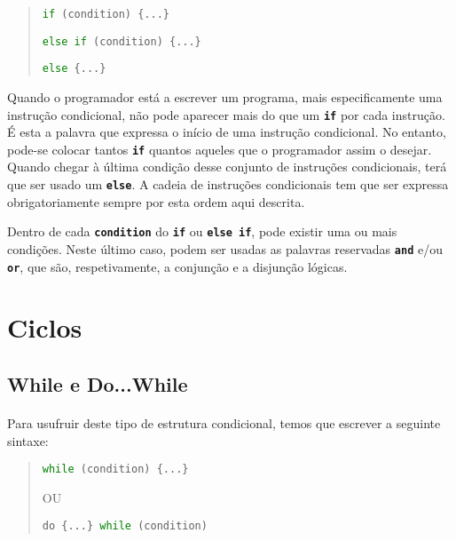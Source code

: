 \documentclass{report}
\begin{document}
\begin{quote}
	\texttt{\textcolor{green}{if} (condition) \{...\} }
	
	\texttt{\textcolor{green}{else if} (condition) \{...\}}
	
	\texttt{\textcolor{green}{else} \{...\}}
\end{quote}

Quando o programador está a escrever um programa, mais especificamente uma instrução condicional, não pode aparecer mais do que um \textbf{\texttt{if}} por cada instrução. É esta a palavra que expressa o início de uma instrução condicional. No entanto, pode-se colocar tantos \textbf{\texttt{if}} quantos aqueles que o programador assim o desejar. Quando chegar à última condição desse conjunto de instruções condicionais, terá que ser usado um \textbf{\texttt{else}}. A cadeia de instruções condicionais tem que ser expressa obrigatoriamente sempre por esta ordem aqui descrita.

Dentro de cada \textbf{\texttt{condition}} do \textbf{\texttt{if}} ou \textbf{\texttt{else if}}, pode existir uma ou mais condições. Neste último caso, podem ser usadas as palavras reservadas \textbf{\texttt{and}} e/ou \textbf{\texttt{or}}, que são, respetivamente, a conjunção e a disjunção lógicas.


\section{Ciclos}

\paragraph{}


\subsection{While e Do...While}

\paragraph{}

Para usufruir deste tipo de estrutura condicional, temos que escrever a seguinte sintaxe:

\begin{quote}
	\texttt{\textcolor{green}{while} (condition) \{...\} }
	
	OU
	
	\texttt{do \{...\} \textcolor{green}{while} (condition)}
\end{quote}
\end{document}
